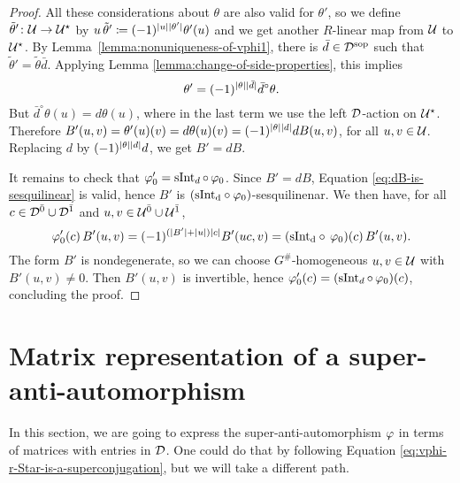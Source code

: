 \documentclass{amsbook}
\begin{document}
\begin{proof}
    All these considerations about $\theta$ are also valid for $\theta'$, so we define $\tilde\theta'\colon \mathcal U \to \mathcal U^\star$ by $u\,\tilde\theta' \coloneqq (-1)^{|u||\theta'|} \theta'(u)$ and we get another $R$-linear map from $\mathcal U$ to $\mathcal U^\star$.
    By Lemma~\ref{lemma:nonuniqueness-of-vphi1}, there is $\bar d\in \mathcal{D}^{\mathrm{sop}}$ such that $\tilde\theta' = \tilde\theta \bar d$.
    Applying Lemma \ref{lemma:change-of-side-properties}, this implies \[\theta' = (-1)^{|\theta||\bar d|} \bar d^\circ \theta.\]
    But $\bar d^\circ \theta (u) = d\theta(u)$, where in the last term we use the left $\mathcal{D}$-action on $\mathcal U^\star$. 
    Therefore $B'(u,v) = \theta'(u)(v) = d\theta(u)(v) = (-1)^{|\theta||d|} dB(u, v)$, for all $u,v \in \mathcal U$. 
    Replacing $d$ by $(-1)^{|\theta||d|} d$, we get $B' = dB$. 
    
    It remains to check that $\varphi_0' = \operatorname{sInt}_d \circ\, \varphi_0$. 
    Since $B' = dB$, Equation \eqref{eq:dB-is-sesquilinear} is valid, hence $B'$ is $(\operatorname{sInt_d \circ \varphi_0})$-sesquilinenar.
    We then have, for all $c\in \mathcal{D}^{\bar0} \cup \mathcal{D}^{\bar1}$ and $u,v \in \mathcal U^{\bar0} \cup \mathcal U^{\bar1}$,
    \[
        \varphi_0'(c)\, B'(u,v) = (-1)^{(|B'| + |u|) |c|} B'(uc,v) = (\operatorname{sInt_d \circ\, \varphi_0}) (c)\, B'(u,v).
    \]
    The form $B'$ is nondegenerate, so we can choose $G^\#$-homogeneous $u,v\in \mathcal U$ with $B'(u,v)\neq 0$. Then $B'(u,v)$ is invertible, hence $\varphi_0' (c) = (\operatorname{sInt}_d \circ\, \varphi_0) (c)$, concluding the proof.
\end{proof}


\section{Matrix representation of a super-anti-automorphism}

In this section, we are going to express the super-anti-automorphism $\varphi$ in terms of matrices with entries in $\mathcal{D}$. 
One could do that by following Equation \eqref{eq:vphi-r-Star-is-a-superconjugation}, but we will take a different path. 
\end{document}
